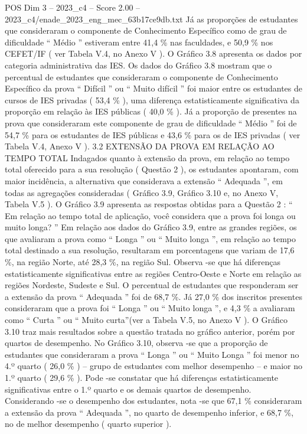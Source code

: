 \begin{textsample}{POS Dim 3 – 2023\_c4 – Score 2.00 – 2023\_c4/enade\_2023\_eng\_mec\_63b17ce9db.txt}
Já as proporções de estudantes que consideraram o componente de Conhecimento Específico como de grau de dificuldade “ Médio ” estiveram entre 41,4 \% nas faculdades, e 50,9 \% nos CEFET/IF ( ver Tabela V.4, no Anexo V ).
O Gráfico 3.8 apresenta os dados por categoria administrativa das IES.
Os dados do Gráfico 3.8 mostram que o percentual de estudantes que consideraram o componente de Conhecimento Específico da prova “ Difícil ” ou “ Muito difícil ” foi maior entre os estudantes de cursos de IES privadas ( 53,4 \% ), uma diferença estatisticamente significativa da proporção em relação às IES públicas ( 40,0 \% ).
Já a proporção de presentes na prova que consideraram este componente de grau de dificuldade “ Médio ” foi de 54,7 \% para os estudantes de IES públicas e 43,6 \% para os de IES privadas ( ver Tabela V.4, Anexo V ). 3.2 EXTENSÃO DA PROVA EM RELAÇÃO AO TEMPO TOTAL Indagados quanto à extensão da prova, em relação ao tempo total oferecido para a sua resolução ( Questão 2 ), os estudantes apontaram, com maior incidência, a alternativa que considerava a extensão “ Adequada ”, em todas as agregações consideradas ( Gráfico 3.9, Gráfico 3.10 e, no Anexo V, Tabela V.5 ).
O Gráfico 3.9 apresenta as respostas obtidas para a Questão 2 : “ Em relação ao tempo total de aplicação, você considera que a prova foi longa ou muito longa? ” Em relação aos dados do Gráfico 3.9, entre as grandes regiões, os que avaliaram a prova como “ Longa ” ou “ Muito longa ”, em relação ao tempo total destinado a sua resolução, resultaram em porcentagens que variam de 17,6 \%, na região Norte, até 28,3 \%, na região Sul.
Observa -se que há diferenças estatisticamente significativas entre as regiões Centro-Oeste e Norte em relação as regiões Nordeste, Sudeste e Sul.
O percentual de estudantes que responderam ser a extensão da prova “ Adequada ” foi de 68,7 \%.
Já 27,0 \% dos inscritos presentes consideraram que a prova foi “ Longa ” ou “ Muito longa ”, e 4,3 \% a avaliaram como “ Curta ” ou “ Muito curta”(ver a Tabela V.5, no Anexo V ).
O Gráfico 3.10 traz mais resultados sobre a questão tratada no gráfico anterior, porém por quartos de desempenho.
No Gráfico 3.10, observa -se que a proporção de estudantes que consideraram a prova “ Longa ” ou “ Muito Longa ” foi menor no 4.º quarto ( 26,0 \% ) – grupo de estudantes com melhor desempenho – e maior no 1.º quarto ( 29,6 \% ).
Pode -se constatar que há diferenças estatisticamente significativas entre o 1.º quarto e os demais quartos de desempenho.
Considerando -se o desempenho dos estudantes, nota -se que 67,1 \% consideraram a extensão da prova “ Adequada ”, no quarto de desempenho inferior, e 68,7 \%, no de melhor desempenho ( quarto superior ).

\end{textsample}
